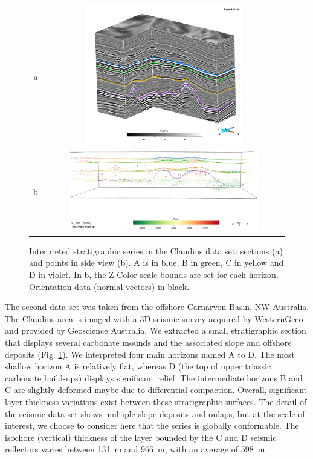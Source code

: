 \documentclass[preprint]{ring20}
\begin{document}
\begin{figure}
\centering\begin{tabular}{cc}
a & \includegraphics[width=0.7\textwidth,height=6cm]{Claudius}\\
b & \includegraphics[width=0.8\textwidth]{Claudius1} \\
\end{tabular}
\caption{Interpreted stratigraphic series in the Claudius data set: sections (a) and points in side view (b). A is in blue, B in green, C in yellow and D in violet. In b, the Z Color scale bounds are set for each horizon. Orientation data (normal vectors) in black.}
\label{fig:ClaudiusData}
\end{figure}

The second data set was taken from the offshore Carnarvon Basin, NW Australia. The Claudius area is imaged with a 3D seismic survey acquired by WesternGeco and provided by Geoscience Australia. We extracted a small stratigraphic section that displays several carbonate mounds and the associated slope and offshore deposits (Fig. \ref{fig:ClaudiusData}). We interpreted four main horizons named A to D. The most shallow horizon A is relatively flat, whereas D (the top of upper triassic carbonate build-ups) displays significant relief. The intermediate horizons B and C are slightly deformed maybe due to differential compaction. Overall, significant layer thickness variations exist between these stratigraphic surfaces. The detail of the seismic data set shows multiple slope deposits and onlaps, but at the scale of interest, we choose to consider here that the series is globally conformable. The isochore (vertical) thickness of the layer bounded by the C and D seismic reflectors varies between 131~m and 966~m, with an average of 598~m. 
\end{document}
